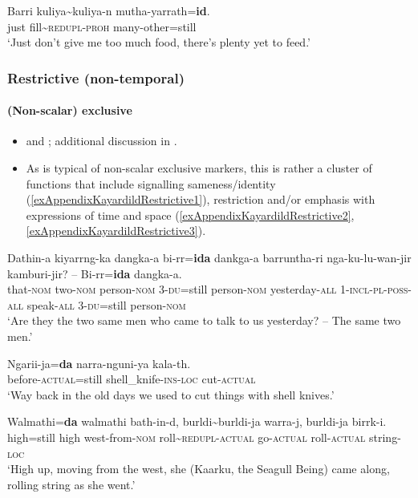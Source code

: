 \begin{exe}
	\ex
	\gll Barri kuliya\sim{}kuliya-n mutha-yarrath=\textbf{id}.\\
	just fill\sim{}\textsc{redupl}-\textsc{proh} many-other=still\\
	\glt \lq Just don't give me too much food, there's plenty yet to feed.\rq{ }
	\parencite[384]{Evans1995}
\end{exe}


\subsubsection{Restrictive (non-temporal)}
\paragraph{(Non-scalar) exclusive}
\label{appendixKayardildRestrictive}
\begin{itemize}
	\item \textcite[389–392]{Evans1995} and \textcite[173–174, 181–183, 202–203]{Round2009}; additional discussion in \textcite{SchultzeBerndt2002}.
	\item As is typical of non-scalar exclusive markers, this is rather a cluster of functions that include signalling sameness/identity (\ref{exAppendixKayardildRestrictive1}), restriction and/or emphasis with expressions of time and space (\ref{exAppendixKayardildRestrictive2}, \ref{exAppendixKayardildRestrictive3}).
\end{itemize}
\begin{exe}
	\ex \label{exAppendixKayardildRestrictive1}
	\gll Dathin-a kiyarrng-ka dangka-a bi-rr=\textbf{ida} dankga-a barruntha-ri nga-ku-lu-wan-jir kamburi-jir? – Bi-rr=\textbf{ida} dangka-a.\\
	that-\textsc{nom} two-\textsc{nom} person-\textsc{nom} 3-\textsc{du}=still person-\textsc{nom} yesterday-\textsc{all} 1-\textsc{incl}-\textsc{pl}-\textsc{poss}-\textsc{all} speak-\textsc{all} {} 3-\textsc{du}=still person-\textsc{nom}\\
	\glt \lq Are they the two same men who came to talk to us yesterday? -- The same two men.' \parencite[390]{Evans1995}
	
	\ex \label{exAppendixKayardildRestrictive2}
	\gll Ngarii-ja=\textbf{da} narra-nguni-ya kala-th.\\
	before-\textsc{actual}=still shell\_knife-\textsc{ins}-\textsc{loc} cut-\textsc{actual}\\ 
	\glt \lq Way back in the old days we used to cut things with shell knives.' \parencite[392]{Evans1995}

	\ex \label{exAppendixKayardildRestrictive3}
	\gll Walmathi=\textbf{da} walmathi bath-in-d, burldi\sim burldi-ja warra-j, burldi-ja birrk-i.\\
high=still high west-from-\textsc{nom} roll\sim\textsc{redupl}-\textsc{actual} go-\textsc{actual} roll-\textsc{actual} string-\textsc{loc}\\
\glt \lq High up, moving from the west, she (Kaarku, the Seagull Being) came along, rolling string as she went.' \parencite[309]{Evans1995}
\end{exe}

